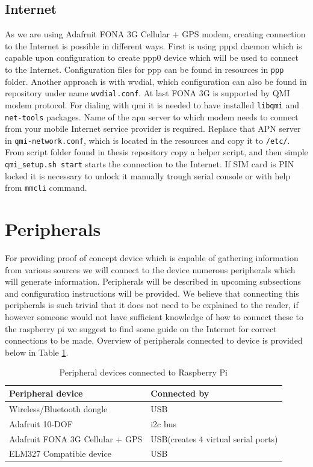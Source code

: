 \subsection{Internet} %
\label{sub:internet}
As we are using Adafruit FONA 3G Cellular + GPS modem, creating connection to the Internet is possible in different ways. First is using pppd daemon which is capable upon configuration to create ppp0 device which will be used to connect to the Internet. Configuration files for ppp can be found in resources in \verb|ppp| folder. Another approach is with wvdial, which configuration can also be found in repository under name \verb|wvdial.conf|. At last FONA 3G is supported by QMI modem protocol. For dialing with qmi it is needed to have installed \verb|libqmi| and \verb|net-tools| packages. Name of the apn server to which modem needs to connect from your mobile Internet service provider is required. Replace that APN server in \verb|qmi-network.conf|, which is located in the resources and copy it to \verb|/etc/|. From script folder found in thesis repository copy a helper script, and then simple \verb|qmi_setup.sh start| starts the connection to the Internet. If SIM card is PIN locked it is necessary to unlock it manually trough serial console or with help from \verb|mmcli| command.
\newpage
\section{Peripherals} %
\label{sec:peripherals}
For providing proof of concept device which is capable of gathering information from various sources we will connect to the device numerous peripherals which will generate information. Peripherals will be described in upcoming subsections and configuration instructions will be provided. We believe that connecting this peripherals is such trivial that it does not need to be explained to the reader, if however someone would not have sufficient knowledge of how to connect these to the raspberry pi we suggest to find some guide on the Internet for correct connections to be made. Overview of peripherals connected to device is provided below in Table \ref{tab:tab2}.
\begin{table}[H]
 \begin{center}
   \begin{tabular}{l l}
   Peripheral device & Connected by\\
   \hline
   	Wireless/Bluetooth dongle & USB\\
	Adafruit 10-DOF & \gls{i2c} bus\\
	Adafruit FONA 3G Cellular + GPS & USB(creates 4 virtual serial ports)\\
	ELM327 Compatible device & USB\\
   \hline
   \end{tabular}
 \end{center}
 \caption{Peripheral devices connected to Raspberry Pi}
 \label{tab:tab2}
\end{table}
